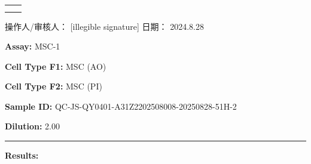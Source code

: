 \documentclass[UTF8,10pt,a4paper,fontset=fandol]{ctexart}
\newcommand{\fieldvalue}[1]{#1}
\newcommand{\handwritten}[1]{#1}
\begin{document}
\bigskip

\begin{center}
\begin{tabular}{cc}
\fbox{\rule{0pt}{0.26\textheight}\rule{0.42\textwidth}{0pt}}
&
\fbox{\rule{0pt}{0.26\textheight}\rule{0.42\textwidth}{0pt}}
\\[1em]
\fbox{\rule{0pt}{0.26\textheight}\rule{0.42\textwidth}{0pt}}
&
\fbox{\rule{0pt}{0.26\textheight}\rule{0.42\textwidth}{0pt}}
\end{tabular}
\end{center}

\vfill

\noindent 操作人/审核人：%
\fieldvalue{\handwritten{[illegible signature]}}
\hfill
日期：%
\fieldvalue{\handwritten{2024.8.28}}

\newpage

\noindent
\textbf{Assay:} \fieldvalue{MSC-1}

\medskip

\textbf{Cell Type F1:} \fieldvalue{MSC (AO)}

\textbf{Cell Type F2:} \fieldvalue{MSC (PI)}

\medskip

\textbf{Sample ID:} \fieldvalue{QC-JS-QY0401-A31Z2202508008-20250828-51H-2}

\textbf{Dilution:} \fieldvalue{2.00}

\medskip
\hrule
\medskip

\textbf{Results:}

\medskip
\end{document}
